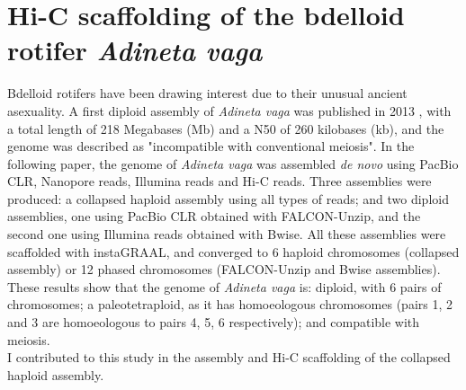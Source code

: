 
\chapter{Hi-C scaffolding of the bdelloid rotifer \textit{Adineta vaga}}

Bdelloid rotifers have been drawing interest due to their unusual ancient asexuality. A first diploid assembly of \textit{Adineta vaga} was published in 2013 \cite{flot2013}, with a total length of 218 Megabases (Mb) and a N50 of 260 kilobases (kb), and the genome was described as "incompatible with conventional meiosis". In the following paper, the genome of \textit{Adineta vaga} was assembled \textit{de novo} using PacBio CLR, Nanopore reads, Illumina reads and Hi-C reads. Three assemblies were produced: a collapsed haploid assembly using all types of reads; and two diploid assemblies, one using PacBio CLR obtained with FALCON-Unzip, and the second one using Illumina reads obtained with Bwise. All these assemblies were scaffolded with instaGRAAL, and converged to 6 haploid chromosomes (collapsed assembly) or 12 phased chromosomes (FALCON-Unzip and Bwise assemblies). These results show that the genome of \textit{Adineta vaga} is: diploid, with 6 pairs of chromosomes; a paleotetraploid, as it has homoeologous chromosomes (pairs 1, 2 and 3 are homoeologous to pairs 4, 5, 6 respectively); and compatible with meiosis. \\
I contributed to this study in the assembly and Hi-C scaffolding of the collapsed haploid assembly. 

